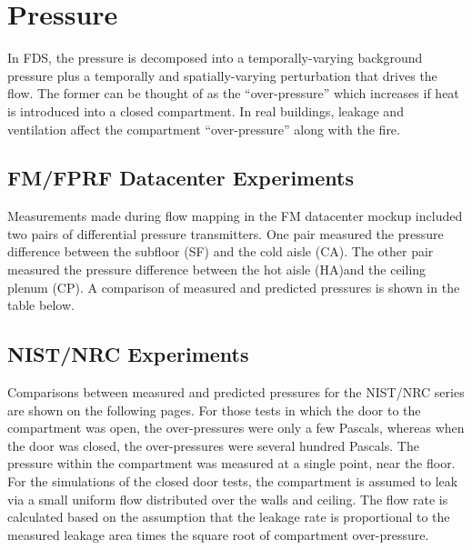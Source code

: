 
\chapter{Pressure}

In FDS, the pressure is decomposed into a temporally-varying background pressure plus a temporally and spatially-varying perturbation that drives the flow. The former can be thought of as the ``over-pressure'' which increases if heat is introduced into a closed compartment. In real buildings, leakage and ventilation affect the compartment ``over-pressure'' along with the fire.

\section{FM/FPRF Datacenter Experiments}

Measurements made during flow mapping in the FM datacenter mockup included two pairs of differential pressure transmitters. One pair measured the pressure difference between the subfloor (SF) and the cold aisle (CA).  The other pair measured the pressure difference between the hot aisle (HA)and the ceiling plenum (CP). A comparison of measured and predicted pressures is shown in the table below.


\section{NIST/NRC Experiments}

Comparisons between measured and predicted pressures for the NIST/NRC series are shown on the following pages. For those tests in which the door to the compartment was open, the over-pressures were only a few Pascals, whereas when the door was closed, the over-pressures were several hundred Pascals. The pressure within the compartment was measured at a single point, near the floor. For the simulations of the closed door tests, the compartment is assumed to leak via a small uniform flow distributed over the walls and ceiling. The flow rate is calculated based on the assumption that the leakage rate is proportional to the measured leakage area times the square root of compartment over-pressure.


